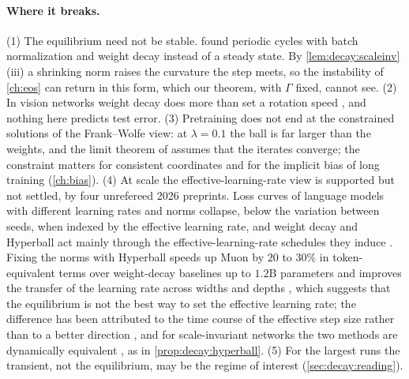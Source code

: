 \begin{refsection}
\paragraph{Where it breaks.} (1) The equilibrium need not be stable. \Textcite{LobachevaEtAl2021} found periodic cycles with batch normalization and weight decay instead of a steady state. By \cref{lem:decay:scaleinv}(iii) a shrinking norm raises the curvature the step meets, so the instability of \cref{ch:eos} can return in this form, which our theorem, with $\Gamma$ fixed, cannot see. (2) In vision networks weight decay does more than set a rotation speed \parencite{ZhangEtAl2019}, and nothing here predicts test error. (3) Pretraining does not end at the constrained solutions of the Frank--Wolfe view: at $\lambda=0.1$ the ball is far larger than the weights, and the limit theorem of \textcite{XieLi2024} assumes that the iterates converge; the constraint matters for consistent coordinates and for the implicit bias of long training (\cref{ch:bias}). (4) At scale the effective-learning-rate view is supported but not settled, by four unrefereed 2026 preprints. Loss curves of language models with different learning rates and norms collapse, below the variation between seeds, when indexed by the effective learning rate, and weight decay and Hyperball act mainly through the effective-learning-rate schedules they induce \parencite{LiuEtAl2026ELR}. Fixing the norms with Hyperball speeds up Muon by $20$ to $30\%$ in token-equivalent terms over weight-decay baselines up to $1.2$B parameters and improves the transfer of the learning rate across widths and depths \parencite{WenEtAl2026Hyperball}, which suggests that the equilibrium is not the best way to set the effective learning rate; the difference has been attributed to the time course of the effective step size rather than to a better direction \parencite{XiaoEtAl2026}, and for scale-invariant networks the two methods are dynamically equivalent \parencite{YuanEtAl2026}, as in \cref{prop:decay:hyperball}. (5) For the largest runs the transient, not the equilibrium, may be the regime of interest (\cref{sec:decay:reading}).


\end{refsection}
